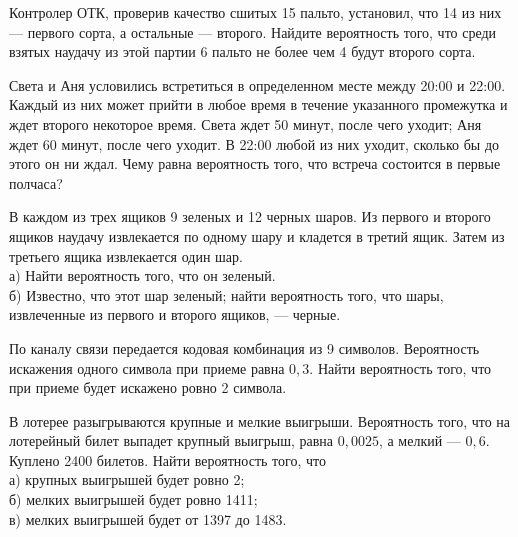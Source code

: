 \newpage\setcounter{zad}{0}



\begin{zkrW}{20}\noindent 
	Контролер ОТК, проверив качество сшитых 15 пальто, установил, что 14 из них --- первого сорта, а остальные --- второго. Найдите вероятность того, что среди взятых наудачу из этой партии 6 пальто не более чем 4 будут второго сорта.
 
\end{zkrW}

\begin{zkrW}{20}\noindent 
	Света и Аня условились встретиться в определенном месте между 20:00 и 22:00. Каждый из них может прийти в любое время в течение указанного промежутка и ждет второго некоторое время. Света ждет 50 минут, после чего уходит; Аня ждет 60 минут, после чего уходит. В 22:00 любой из них уходит, сколько бы до этого он ни ждал. Чему равна вероятность того, что встреча состоится в первые полчаса?
 
\end{zkrW}

\begin{zkrW}{20}\noindent 
	В каждом из трех ящиков 9 зеленых и 12 черных шаров. Из первого и второго ящиков наудачу извлекается по одному шару и кладется в третий ящик. Затем из третьего ящика извлекается один шар. \\ \indent а) Найти вероятность того, что он зеленый. \\ \indent б) Известно, что этот шар зеленый; найти вероятность того, что шары, извлеченные из первого и второго ящиков, --- черные.
 
\end{zkrW}

\begin{zkrW}{20}\noindent 
	По каналу связи передается кодовая комбинация из 9 символов. Вероятность искажения одного символа при приеме равна $0{,}3$. Найти вероятность того, что при приеме будет искажено ровно 2 символа.
 
\end{zkrW}

\begin{zkrW}{20}\noindent 
	В лотерее разыгрываются крупные и мелкие выигрыши. Вероятность того, что на лотерейный билет выпадет крупный выигрыш, равна $0{,}0025$, а мелкий --- $0{,}6$. Куплено 2400 билетов. Найти вероятность того, что \\ \indent а) крупных выигрышей будет ровно 2; \\ \indent б) мелких выигрышей будет ровно 1411; \\ \indent в) мелких выигрышей будет от 1397 до 1483.
 
\end{zkrW}

